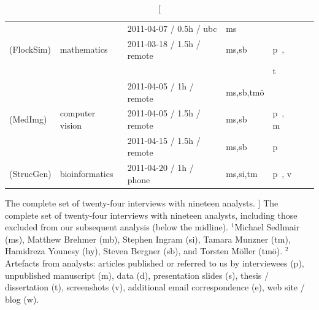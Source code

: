 \begin{table}
\begin{center}
\begin{tabular}{ | l | l | l | l | l | l | l |}
        & & 2011-04-07 / 0.5h / {\sc ubc} & {\sc ms} &
        
        \\
        
        {rownumber} 
		\therownumber\label{drvistasks:analyst:ASN} ({\sc FlockSim}) %
        
        & mathematics & 2011-03-18 / 1.5h / remote & {\sc ms,sb} & p~\cite{Buhl2006,Eftimie2007,Eftimie2011,Fetecau2010},
        
        \\
        
        & & & &t~\cite{Abdolyousefi2011,Eftimie2008} %
        
        \\
        
        &  & 2011-04-05 / 1h / remote & {\sc ms,sb,tm\"{o}} &
        
        \\
        
        \rowcolor{gray!15}
        
        {rownumber} 
		\therownumber\label{drvistasks:analyst:AS} ({\sc MedImg}) %
        
        & computer vision\index{computer vision} & 2011-04-05 / 1.5h / remote & {\sc ms,sb} & p~\cite{Andrews2010a,Saad2010,Saad2008}, m
        
        \\
        
        \rowcolor{gray!15}
        
        &  & 2011-04-15 / 1.5h / remote & {\sc ms,sb} & p~\cite{Saad2010a,Torsney-Weir2011} 
        
        \\
        
        {rownumber} 
		\therownumber\label{drvistasks:analyst:JWB} ({\sc StrucGen}) %
        
        & bioinformatics\index{bioinformatics} & 2011-04-20 / 1h / phone & {\sc ms,si,tm} & p~\cite{Gabanyi2011}, v
        
        \\
        
        \hline
        
    \end{tabular}
    
    \caption
    [
        The complete set of twenty-four interviews with nineteen analysts.
    ]
    {
        The complete set of twenty-four interviews with nineteen analysts, including those excluded from our subsequent analysis (below the midline). $^{1}$Michael Sedlmair ({\sc ms}), Matthew Brehmer ({\sc mb}), Stephen Ingram ({\sc si}), Tamara Munzner ({\sc tm}), Hamidreza Younesy ({\sc hy}), Steven Bergner ({\sc sb}), and Torsten M\"{o}ller ({\sc tm\"{o}}). $^{2}$Artefacts from analysts: articles published or referred to us by interviewees (p), unpublished manuscript (m), data (d), presentation slides (s), thesis / dissertation (t), screenshots (v), additional email correspondence (e), web site / blog (w).
    }
    

\end{center}
\end{table}

